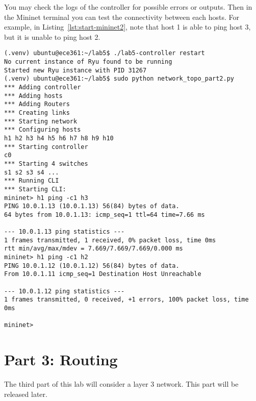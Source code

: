 \documentclass[11pt]{article}
\begin{document}
You may check the logs of the controller for possible errors or outputs.
Then in the Mininet terminal you can test the connectivity between each hosts.
For example, in Listing~\ref{lst:start-mininet2}, note that host 1 is able to ping host 3, but it is unable to ping host 2.
\begin{lstlisting}[style=ece361shell, caption={Sample workflow for creating the topology in part 2 and testing the code.}, label={lst:start-mininet2}]
(.venv) ubuntu@ece361:~/lab5$ ./lab5-controller restart
No current instance of Ryu found to be running
Started new Ryu instance with PID 31267
(.venv) ubuntu@ece361:~/lab5$ sudo python network_topo_part2.py
*** Adding controller
*** Adding hosts
*** Adding Routers
*** Creating links
*** Starting network
*** Configuring hosts
h1 h2 h3 h4 h5 h6 h7 h8 h9 h10
*** Starting controller
c0
*** Starting 4 switches
s1 s2 s3 s4 ...
*** Running CLI
*** Starting CLI:
mininet> h1 ping -c1 h3
PING 10.0.1.13 (10.0.1.13) 56(84) bytes of data.
64 bytes from 10.0.1.13: icmp_seq=1 ttl=64 time=7.66 ms

--- 10.0.1.13 ping statistics ---
1 frames transmitted, 1 received, 0% packet loss, time 0ms
rtt min/avg/max/mdev = 7.669/7.669/7.669/0.000 ms
mininet> h1 ping -c1 h2
PING 10.0.1.12 (10.0.1.12) 56(84) bytes of data.
From 10.0.1.11 icmp_seq=1 Destination Host Unreachable

--- 10.0.1.12 ping statistics ---
1 frames transmitted, 0 received, +1 errors, 100% packet loss, time 0ms

mininet>
\end{lstlisting}


\section{Part 3: Routing}
\label{sec:exercise3}
The third part of this lab will consider a layer 3 network. This part will be released later.

\end{document}

